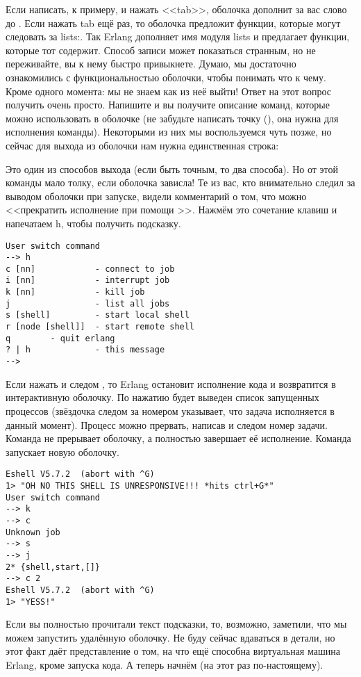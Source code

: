 Если написать, к примеру,  и нажать <<tab>>, оболочка дополнит за вас слово до .
Если нажать tab ещё раз, то оболочка предложит функции, которые могут следовать за lists:.
Так Erlang дополняет имя модуля lists и предлагает функции, которые тот содержит.
Способ записи может показаться странным, но не переживайте, вы к нему быстро привыкнете.
Думаю, мы достаточно ознакомились с функциональностью оболочки, чтобы понимать что к чему.
Кроме одного момента: мы не знаем как из неё выйти!
Ответ на этот вопрос получить очень просто.
Напишите  и вы получите описание команд, которые можно использовать в оболочке (не забудьте написать точку (), она нужна для исполнения команды).
Некоторыми из них мы воспользуемся чуть позже, но сейчас для выхода из оболочки нам нужна единственная строка:\\ 

Это один из способов выхода (если быть точным, то два способа).
Но от этой команды мало толку, если оболочка зависла!
Те из вас, кто внимательно следил за выводом оболочки при запуске, видели комментарий о том, что можно <<прекратить исполнение при помощи >>.
Нажмём это сочетание клавиш и напечатаем h, чтобы получить подсказку.
\begin{lstlisting}[style=repl]
User switch command
--> h
c [nn]            - connect to job
i [nn]            - interrupt job
k [nn]            - kill job
j                 - list all jobs
s [shell]         - start local shell
r [node [shell]]  - start remote shell
q        - quit erlang
? | h             - this message
-->
\end{lstlisting}

Если нажать  и следом , то Erlang остановит исполнение кода и возвратится в интерактивную оболочку.
По нажатию  будет выведен список запущенных процессов (звёздочка следом за номером указывает, что задача исполняется в данный момент).
Процесс можно прервать, написав  и следом номер задачи.
Команда  не прерывает оболочку, а полностью завершает её исполнение.
Команда  запускает новую оболочку.
\begin{lstlisting}[style=repl]
Eshell V5.7.2  (abort with ^G)
1> "OH NO THIS SHELL IS UNRESPONSIVE!!! *hits ctrl+G*"
User switch command
--> k
--> c
Unknown job
--> s
--> j
2* {shell,start,[]}
--> c 2
Eshell V5.7.2  (abort with ^G)
1> "YESS!"
\end{lstlisting}

Если вы полностью прочитали текст подсказки, то, возможно, заметили, что мы можем запустить удалённую оболочку.
Не буду сейчас вдаваться в детали, но этот факт даёт представление о том, на что ещё способна виртуальная машина Erlang, кроме запуска кода.
А теперь начнём (на этот раз по\--настоящему).
